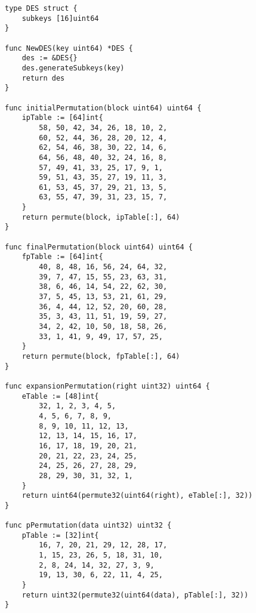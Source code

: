 \begin{lstlisting}[style=golang, caption={Реализация алгоритма шифрования и расшифровки с открытым ключом файла}, label=lst:codegolang]
type DES struct {
	subkeys [16]uint64
}

func NewDES(key uint64) *DES {
	des := &DES{}
	des.generateSubkeys(key)
	return des
}

func initialPermutation(block uint64) uint64 {
	ipTable := [64]int{
		58, 50, 42, 34, 26, 18, 10, 2,
		60, 52, 44, 36, 28, 20, 12, 4,
		62, 54, 46, 38, 30, 22, 14, 6,
		64, 56, 48, 40, 32, 24, 16, 8,
		57, 49, 41, 33, 25, 17, 9, 1,
		59, 51, 43, 35, 27, 19, 11, 3,
		61, 53, 45, 37, 29, 21, 13, 5,
		63, 55, 47, 39, 31, 23, 15, 7,
	}
	return permute(block, ipTable[:], 64)
}

func finalPermutation(block uint64) uint64 {
	fpTable := [64]int{
		40, 8, 48, 16, 56, 24, 64, 32,
		39, 7, 47, 15, 55, 23, 63, 31,
		38, 6, 46, 14, 54, 22, 62, 30,
		37, 5, 45, 13, 53, 21, 61, 29,
		36, 4, 44, 12, 52, 20, 60, 28,
		35, 3, 43, 11, 51, 19, 59, 27,
		34, 2, 42, 10, 50, 18, 58, 26,
		33, 1, 41, 9, 49, 17, 57, 25,
	}
	return permute(block, fpTable[:], 64)
}

func expansionPermutation(right uint32) uint64 {
	eTable := [48]int{
		32, 1, 2, 3, 4, 5,
		4, 5, 6, 7, 8, 9,
		8, 9, 10, 11, 12, 13,
		12, 13, 14, 15, 16, 17,
		16, 17, 18, 19, 20, 21,
		20, 21, 22, 23, 24, 25,
		24, 25, 26, 27, 28, 29,
		28, 29, 30, 31, 32, 1,
	}
	return uint64(permute32(uint64(right), eTable[:], 32))
}

func pPermutation(data uint32) uint32 {
	pTable := [32]int{
		16, 7, 20, 21, 29, 12, 28, 17,
		1, 15, 23, 26, 5, 18, 31, 10,
		2, 8, 24, 14, 32, 27, 3, 9,
		19, 13, 30, 6, 22, 11, 4, 25,
	}
	return uint32(permute32(uint64(data), pTable[:], 32))
}


\end{lstlisting}
